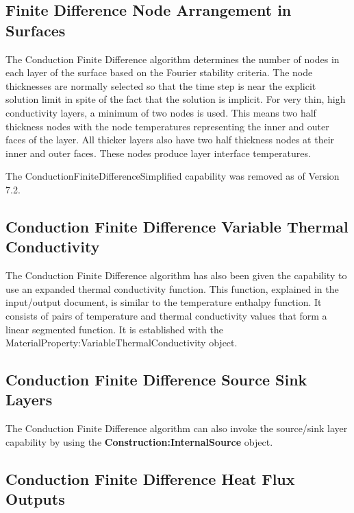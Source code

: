 \subsection{Finite Difference Node Arrangement in Surfaces}%
\label{finite-difference-node-arrangement-in-surfaces}

The Conduction Finite Difference algorithm determines the number of nodes in
each layer of the surface based on the Fourier stability criteria. The node
thicknesses are normally selected so that the time step is near the explicit
solution limit in spite of the fact that the solution is implicit. For very
thin, high conductivity layers, a minimum of two nodes is used. This means two
half thickness nodes with the node temperatures representing the inner and outer
faces of the layer. All thicker layers also have two half thickness nodes at
their inner and outer faces. These nodes produce layer interface temperatures.

The ConductionFiniteDifferenceSimplified capability was removed as of Version
7.2.

\subsection{Conduction Finite Difference Variable Thermal Conductivity}%
\label{conduction-finite-difference-variable-thermal-conductivity}

The Conduction Finite Difference algorithm has also been given the capability to
use an expanded thermal conductivity function. This function, explained in the
input/output document, is similar to the temperature enthalpy function. It
consists of pairs of temperature and thermal conductivity values that form a
linear segmented function. It is established with the
MaterialProperty:VariableThermalConductivity object.

\subsection{Conduction Finite Difference Source Sink Layers}%
\label{conduction-finite-difference-source-sink-layers}

The Conduction Finite Difference algorithm can also invoke the source/sink layer
capability by using the \textbf{Construction:InternalSource} object.

\subsection{Conduction Finite Difference Heat Flux Outputs}%
\label{conduction-finite-difference-heat-flux-outputs}

